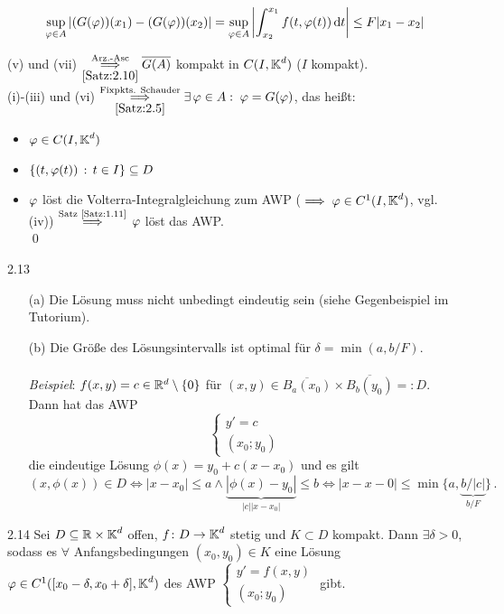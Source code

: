 \documentclass[a4paper]{article}
\begin{document}
\begin{Beweis}
\begin{itemize}
\[\sup_{\operatorname{\varphi}\in A}\left|(G(\operatorname{\varphi}))(x_1)-(G(\operatorname{\varphi}))(x_2)\right|
=\sup_{\operatorname{\varphi}\in A}\left|\int_{x_2}^{x_1}f(t,\operatorname{\varphi}(t))\mathop{}\!\mathrm{d} t\right|\le F|x_1-x_2|
\]
\end{itemize}
(v) und (vii) $\overset{\text{Arz.-Asc}}{\underset{\ref{Satz:2.10}}{\implies}} \overline{G(A)}$ kompakt in $C(I,\operatorname{\mathbb K}^d)$ ($I$ kompakt).\\
(i)-(iii) und (vi) $\overset{\text{Fixpkts. Schauder}}{\underset{\ref{Satz:2.5}}{\implies}}\exists \operatorname{\varphi}\in A:\;\operatorname{\varphi}=G(\operatorname{\varphi})$, das heißt:
\begin{itemize}
\item $\operatorname{\varphi}\in C(I,\operatorname{\mathbb K}^d)$
\item $\{(t,\operatorname{\varphi}(t))\,:\,t\in I\}\subseteq D$
\item $\operatorname{\varphi}$ löst die Volterra-Integralgleichung zum AWP ($\implies \operatorname{\varphi}\in C^1(I,\operatorname{\mathbb K}^d)$, vgl. (iv)) $\overset{\text{Satz \ref{Satz:1.11}}}{\implies}$ $\operatorname{\varphi}$ löst das AWP.\\\qed
\end{itemize}
\end{Beweis}

\begin{Bemerkung}{}{2.13}
\begin{itemize}
\item[(a)] Die Lösung muss nicht unbedingt eindeutig sein (siehe Gegenbeispiel im Tutorium).
\item[(b)] Die Größe des Lösungsintervalls ist optimal für $\delta=\min(a,b/F)$.\\
\ \\
\textit{Beispiel}: $f(x,y)=c\in\mathbb R^d\setminus\{0\}$ für $(x,y)\in\overline{B_a(x_0)}\times \overline{B_b(y_0)}=:D$. Dann hat das AWP
 \[\left\{ \begin{array}{l}
 y'=c\\
 (x_0;y_0)
\end{array}\right.  \]
die eindeutige Lösung $\phi(x)=y_0+c(x-x_0)$ und es gilt
\[(x,\phi(x))\in D\iff |x-x_0|\le a\wedge \underbrace{|\phi(x)-y_0|}_{|c||x-x_0|}\le b
\iff |x-x-0|\le \min\{a,\underbrace{b/|c|}_{b/F}\}\,.
\]
\end{itemize}
\end{Bemerkung}

\begin{Kor}{}{2.14}
Sei $D\subseteq \mathbb R\times \operatorname{\mathbb K}^d$ offen, $f\colon D\to\operatorname{\mathbb K}^d$ stetig und $K\subset D$ kompakt. Dann $\exists\delta>0$, sodass es $\forall$ Anfangsbedingungen $(x_0,y_0)\in K$ eine Lösung $\operatorname{\varphi}\in C^1([x_0-\delta,x_0+\delta],\operatorname{\mathbb K}^d)$ des AWP $\left\{ \begin{array}{c}
y'=f(x,y)\\
(x_0;y_0)
\end{array}\right. $ gibt.
\end{Kor}
\end{document}
